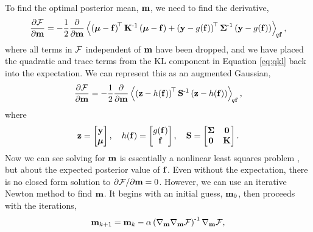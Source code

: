 \documentclass{article} %
\begin{document}
To find the optimal posterior mean, $\pomean$, we need to find the derivative,
\begin{equation}
    \frac{\partial\Fengy}{\partial\pomean} = -\frac{1}{2}
    \frac{\partial}{\partial\pomean} \expec{q\lstate}{
        \brac{\prmean - \lstate}\transpose\prcov\inv
        \brac{\prmean - \lstate}
        + \brac{\obs - \nonlin{\lstate}}\transpose \lcov\inv
            \brac{\obs - \nonlin{\lstate}}},
\end{equation}
where all terms in $\Fengy$ independent of $\pomean$ have been dropped, and we
have placed the quadratic and trace terms from the KL component in Equation
\eqref{eq:qkl} back into the expectation.
We can represent this as an augmented Gaussian,
\begin{equation}
    \frac{\partial\Fengy}{\partial\pomean} = -\frac{1}{2}
        \frac{\partial}{\partial\pomean}
        \expec{q\lstate}{
        \brac{\augobs - \augnonlin{\lstate}}\transpose\augcov\inv
        \brac{\augobs - \augnonlin{\lstate}}
    },
    \label{eq:augsys}
\end{equation}
where
\begin{equation}
    \augobs = \begin{bmatrix} \obs \\ \prmean \end{bmatrix}, \quad
    \augnonlin{\lstate} = \begin{bmatrix} \nonlin{\lstate} \\ \lstate 
        \end{bmatrix}, \quad
    \augcov = \begin{bmatrix} \lcov & \mathbf{0} \\ \mathbf{0} & \prcov 
        \end{bmatrix}.
\end{equation}
Now we can see solving for $\pomean$ is essentially a nonlinear least squares 
problem%
, but about
the expected posterior value of $\lstate$. Even without the expectation, there
is no  closed form solution to $\partial\Fengy/\partial\pomean = 0$.
However, we can use an iterative Newton method to find $\pomean$. It begins
with an initial guess, $\pomean_0$, then proceeds with the iterations,
\begin{equation}
    \pomean_{k+1} = \pomean_k -
    \step\brac{\nabla_\pomean\nabla_\pomean\Fengy}\inv \nabla_\pomean\Fengy,
    \label{eq:newton}
\end{equation}
\end{document}
